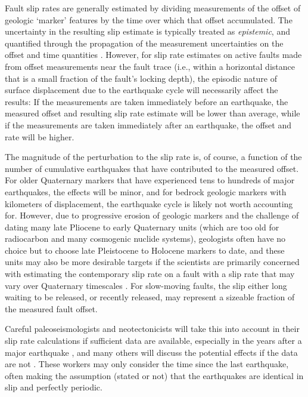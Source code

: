 \documentclass[se, manuscript]{copernicus}
\begin{document}
Fault slip rates are generally estimated by dividing measurements of the
offset of geologic `marker' features by the time over which that offset
accumulated. The uncertainty in the resulting slip estimate is typically
treated as \emph{epistemic}, and quantified through the propagation of
the measurement uncertainties on the offset and time quantities
\citep[e.g.]{bird_uncertainties_2007,zechar_incorporating_2009}.
However, for slip rate estimates on active faults made from offset
measurements near the fault trace (i.e., within a horizontal distance
that is a small fraction of the fault's locking depth), the episodic
nature of surface displacement due to the earthquake cycle will
necessarily affect the results: If the measurements are taken
immediately before an earthquake, the measured offset and resulting slip
rate estimate will be lower than average, while if the measurements are
taken immediately after an earthquake, the offset and rate will be
higher.

The magnitude of the perturbation to the slip rate is, of course, a
function of the number of cumulative earthquakes that have contributed
to the measured offset. For older Quaternary markers that have
experienced tens to hundreds of major earthquakes, the effects will be
minor, and for bedrock geologic markers with kilometers of displacement,
the earthquake cycle is likely not worth accounting for. However, due to
progressive erosion of geologic markers and the challenge of dating many
late Pliocene to early Quaternary units (which are too old for
radiocarbon and many cosmogenic nuclide systems), geologists often have
no choice but to choose late Pleistocene to Holocene markers to date,
and these units may also be more desirable targets if the scientists are
primarily concerned with estimating the contemporary slip rate on a
fault with a slip rate that may vary over Quaternary timescales
\citep[e.g.]{rittase_temporal_2014,zinke_highly_2018}. For slow-moving
faults, the slip either long waiting to be released, or recently
released, may represent a sizeable fraction of the measured fault
offset.

Careful paleoseismologists and neotectonicists will take this into
account in their slip rate calculations if sufficient data are
available, especially in the years after a major earthquake
\citep[e.g.]{rizza_earthquake_2015}, and many others will discuss the
potential effects if the data are not \citep[e.g.]{lifton_latest_2015}.
These workers may only consider the time since the last earthquake,
often making the assumption (stated or not) that the earthquakes are
identical in slip and perfectly periodic.
\end{document}
